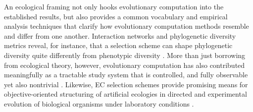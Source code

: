 An ecological framing not only hooks evolutionary computation into the established results, but also provides a common vocabulary and empirical analysis techniques that clarify how evolutionary computation methods resemble and differ from one another.
Interaction networks and phylogenetic diversity metrics reveal, for instance, that a selection scheme can shape phylogenetic diversity quite differently from phenotypic diversity \citep{dolson2018ecological}.
More than just borrowing from ecological theory, however, evolutionary computation has also contributed meaningfully as a tractable study system that is controlled, and fully observable yet also nontrivial \citep{dolson2021digital}.
Likewise, EC selection schemes provide promising means for objective-oriented structuring of artificial ecologies in directed and experimental evolution of biological organisms under laboratory conditions \citep{lalejini2022artificial}.


